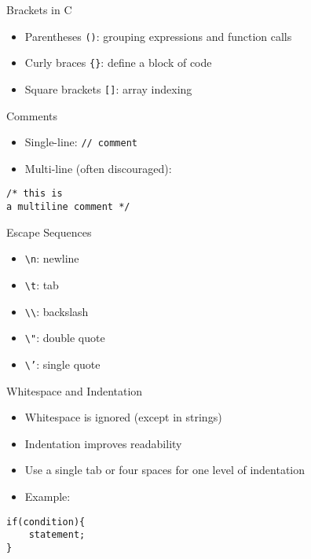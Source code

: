 \documentclass[12pt, aspectratio=169]{beamer}
\begin{document}
    \begin{frame}{Brackets in C}
        \begin{itemize}
            \item Parentheses \texttt{()}: grouping expressions and function calls
            \item Curly braces \texttt{\{\}}: define a block of code
            \item Square brackets \texttt{[]}: array indexing
        \end{itemize}
    \end{frame}


    \begin{frame}[fragile]{Comments}
        \begin{itemize}
            \item Single-line: \texttt{// comment}
            \item Multi-line (often discouraged):
        \end{itemize}
        \begin{verbatim}
/* this is
a multiline comment */
        \end{verbatim}
    \end{frame}


    \begin{frame}{Escape Sequences}
        \begin{itemize}
            \item \texttt{\textbackslash n}: newline
            \item \texttt{\textbackslash t}: tab
            \item \texttt{\textbackslash\textbackslash}: backslash
            \item \texttt{\textbackslash"}: double quote
            \item \texttt{\textbackslash'}: single quote
        \end{itemize}
    \end{frame}


    \begin{frame}[fragile]{Whitespace and Indentation}
        \begin{itemize}
            \item Whitespace is ignored (except in strings)
            \item Indentation improves readability
            \item Use a single tab or four spaces for one level of indentation
            \item Example:
        \end{itemize}
        \begin{verbatim}
if(condition){
    statement;
}
        \end{verbatim}
    \end{frame}
\end{document}

